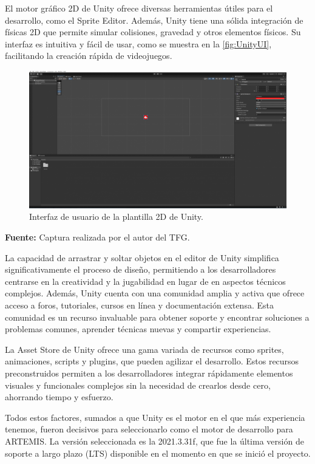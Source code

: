 El motor gráfico 2D de Unity ofrece diversas herramientas útiles para el desarrollo, como el Sprite Editor. Además, Unity tiene una sólida integración de físicas 2D que permite simular colisiones, gravedad y otros elementos físicos. Su interfaz es intuitiva y fácil de usar, como se muestra en la \autoref{fig:UnityUI}, facilitando la creación rápida de videojuegos.

\begin{figure}[h!]
	\centering
	\includegraphics[width=0.7\linewidth]{./Figuras/Aspectos/UnityUI.png}
	\caption{Interfaz de usuario de la plantilla 2D de Unity.}
	\label{fig:UnityUI}
	\vspace{-30pt}
\end{figure}

\begin{center}
	\textbf{Fuente:} Captura realizada por el autor del TFG.
\end{center}

La capacidad de arrastrar y soltar objetos en el editor de Unity simplifica significativamente el proceso de diseño, permitiendo a los desarrolladores centrarse en la creatividad y la jugabilidad en lugar de en aspectos técnicos complejos. Además, Unity cuenta con una comunidad amplia y activa que ofrece acceso a foros, tutoriales, cursos en línea y documentación extensa. Esta comunidad es un recurso invaluable para obtener soporte y encontrar soluciones a problemas comunes, aprender técnicas nuevas y compartir experiencias.

La Asset Store de Unity ofrece una gama variada de recursos como sprites, animaciones, scripts y plugins, que pueden agilizar el desarrollo. Estos recursos preconstruidos permiten a los desarrolladores integrar rápidamente elementos visuales y funcionales complejos sin la necesidad de crearlos desde cero, ahorrando tiempo y esfuerzo.

Todos estos factores, sumados a que Unity es el motor en el que más experiencia tenemos, fueron decisivos para seleccionarlo como el motor de desarrollo para ARTEMIS. La versión seleccionada es la 2021.3.31f, que fue la última versión de soporte a largo plazo (LTS) disponible en el momento en que se inició el proyecto.

